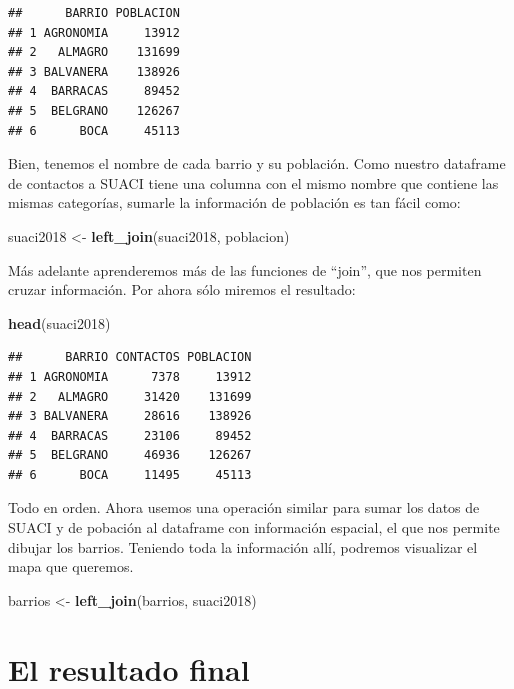 \documentclass[]{book}
\newenvironment{Shaded}{\begin{snugshade}}{\end{snugshade}}
\newcommand{\KeywordTok}[1]{\textcolor[rgb]{0.13,0.29,0.53}{\textbf{#1}}}
\newcommand{\StringTok}[1]{\textcolor[rgb]{0.31,0.60,0.02}{#1}}
\newcommand{\NormalTok}[1]{#1}
\begin{document}
\begin{verbatim}
##      BARRIO POBLACION
## 1 AGRONOMIA     13912
## 2   ALMAGRO    131699
## 3 BALVANERA    138926
## 4  BARRACAS     89452
## 5  BELGRANO    126267
## 6      BOCA     45113
\end{verbatim}

Bien, tenemos el nombre de cada barrio y su población. Como nuestro
dataframe de contactos a SUACI tiene una columna con el mismo nombre que
contiene las mismas categorías, sumarle la información de población es
tan fácil como:

\begin{Shaded}
\begin{Highlighting}[]
\NormalTok{suaci2018 <-}\StringTok{ }\KeywordTok{left_join}\NormalTok{(suaci2018, poblacion)}
\end{Highlighting}
\end{Shaded}

Más adelante aprenderemos más de las funciones de ``join'', que nos
permiten cruzar información. Por ahora sólo miremos el resultado:

\begin{Shaded}
\begin{Highlighting}[]
\KeywordTok{head}\NormalTok{(suaci2018)}
\end{Highlighting}
\end{Shaded}

\begin{verbatim}
##      BARRIO CONTACTOS POBLACION
## 1 AGRONOMIA      7378     13912
## 2   ALMAGRO     31420    131699
## 3 BALVANERA     28616    138926
## 4  BARRACAS     23106     89452
## 5  BELGRANO     46936    126267
## 6      BOCA     11495     45113
\end{verbatim}

Todo en orden. Ahora usemos una operación similar para sumar los datos
de SUACI y de pobación al dataframe con información espacial, el que nos
permite dibujar los barrios. Teniendo toda la información allí, podremos
visualizar el mapa que queremos.

\begin{Shaded}
\begin{Highlighting}[]
\NormalTok{barrios <-}\StringTok{ }\KeywordTok{left_join}\NormalTok{(barrios, suaci2018)}
\end{Highlighting}
\end{Shaded}

\section{El resultado final}\label{el-resultado-final}
\end{document}

